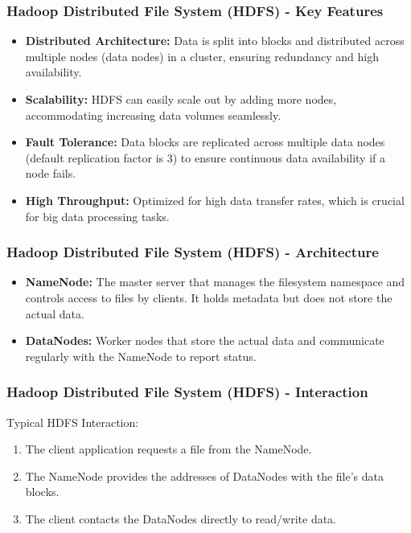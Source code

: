 \documentclass[aspectratio=169]{beamer}
\begin{document}
\begin{frame}[fragile]
    \frametitle{Hadoop Distributed File System (HDFS) - Key Features}
    \begin{itemize}
        \item \textbf{Distributed Architecture:} 
        Data is split into blocks and distributed across multiple nodes (data nodes) in a cluster, ensuring redundancy and high availability.
        
        \item \textbf{Scalability:} 
        HDFS can easily scale out by adding more nodes, accommodating increasing data volumes seamlessly.
        
        \item \textbf{Fault Tolerance:} 
        Data blocks are replicated across multiple data nodes (default replication factor is 3) to ensure continuous data availability if a node fails.
        
        \item \textbf{High Throughput:} 
        Optimized for high data transfer rates, which is crucial for big data processing tasks.
    \end{itemize}
\end{frame}

\begin{frame}[fragile]
    \frametitle{Hadoop Distributed File System (HDFS) - Architecture}
    \begin{itemize}
        \item \textbf{NameNode:} 
        The master server that manages the filesystem namespace and controls access to files by clients. It holds metadata but does not store the actual data.
        
        \item \textbf{DataNodes:} 
        Worker nodes that store the actual data and communicate regularly with the NameNode to report status.
    \end{itemize}
\end{frame}

\begin{frame}[fragile]
    \frametitle{Hadoop Distributed File System (HDFS) - Interaction}
    Typical HDFS Interaction:
    \begin{enumerate}
        \item The client application requests a file from the NameNode.
        \item The NameNode provides the addresses of DataNodes with the file's data blocks.
        \item The client contacts the DataNodes directly to read/write data.
    \end{enumerate}
\end{frame}
\end{document}
